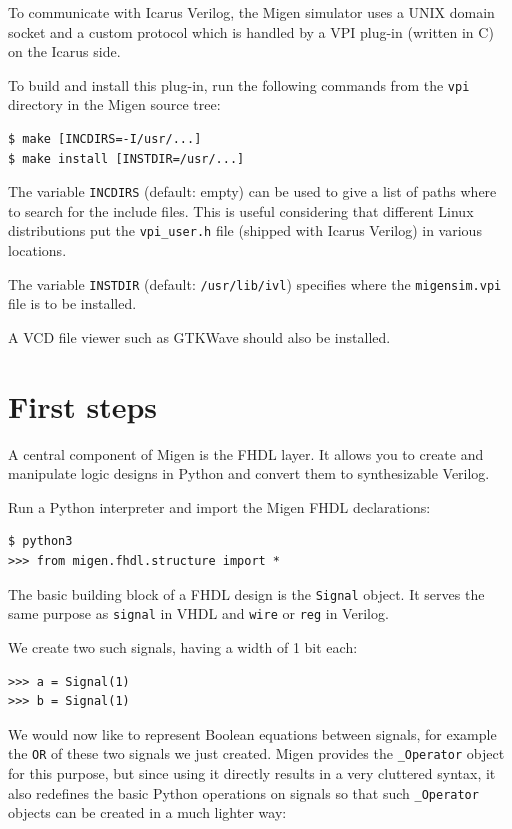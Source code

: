 \documentclass[11pt]{paper}
\begin{document}
To communicate with Icarus Verilog, the Migen simulator uses a UNIX domain socket and a custom protocol which is handled by a VPI plug-in (written in C) on the Icarus side.

To build and install this plug-in, run the following commands from the \verb!vpi! directory in the Migen source tree:

\begin{verbatim}
$ make [INCDIRS=-I/usr/...]
$ make install [INSTDIR=/usr/...]
\end{verbatim}

The variable \verb!INCDIRS! (default: empty) can be used to give a list of paths where to search for the include files. This is useful considering that different Linux distributions put the \verb!vpi_user.h! file (shipped with Icarus Verilog) in various locations.

The variable \verb!INSTDIR! (default: \verb!/usr/lib/ivl!) specifies where the \verb!migensim.vpi! file is to be installed.

A VCD file viewer such as GTKWave should also be installed.

\section{First steps}
A central component of Migen is the FHDL layer. It allows you to create and manipulate logic designs in Python and convert them to synthesizable Verilog.

Run a Python interpreter and import the Migen FHDL declarations:
\begin{verbatim}
$ python3
>>> from migen.fhdl.structure import *
\end{verbatim}

The basic building block of a FHDL design is the \verb!Signal! object. It serves the same purpose as \verb!signal! in VHDL and \verb!wire! or \verb!reg! in Verilog.

We create two such signals, having a width of 1 bit each:
\begin{verbatim}
>>> a = Signal(1)
>>> b = Signal(1)
\end{verbatim}


We would now like to represent Boolean equations between signals, for example the \verb!OR! of these two signals we just created. Migen provides the \verb!_Operator! object for this purpose, but since using it directly results in a very cluttered syntax, it also redefines the basic Python operations on signals so that such \verb!_Operator! objects can be created in a much lighter way:
\end{document}
